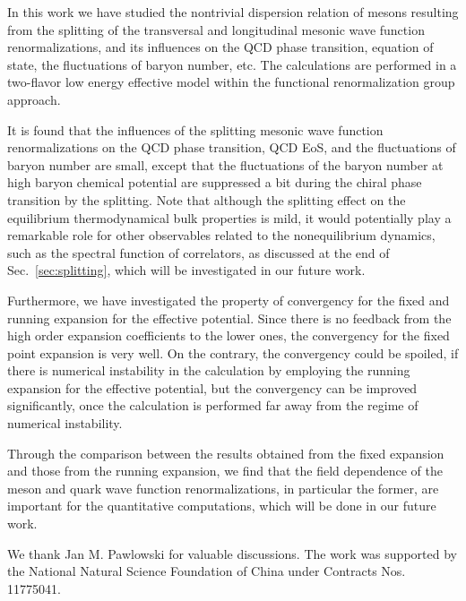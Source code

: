 \documentclass[%
reprint,
superscriptaddress,
showpacs,preprintnumbers,
 amsmath,amssymb,
 aps,
prd,
]{revtex4-1}
\def\sec#1{Sec.~\ref{#1}}
\begin{document}
In this work we have studied the nontrivial dispersion relation of mesons resulting from the splitting of the transversal and longitudinal mesonic wave function renormalizations, and its influences on the QCD phase transition, equation of state, the fluctuations of baryon number, etc. The calculations are performed in a two-flavor low energy effective model within the functional renormalization group approach. 

It is found that the influences of the splitting mesonic wave function renormalizations on the QCD phase transition, QCD EoS, and the fluctuations of baryon number are small, except that the fluctuations of the baryon number at high baryon chemical potential are suppressed a bit during the chiral phase transition by the splitting. Note that although the splitting effect on the equilibrium thermodynamical bulk properties is mild, it would potentially play a remarkable role for other observables related to the nonequilibrium dynamics, such as the spectral function of correlators, as discussed at the end of \sec{sec:splitting}, which will be investigated in our future work.

Furthermore, we have investigated the property of convergency for the fixed and running expansion for the effective potential. Since there is no feedback from the high order expansion coefficients to the lower ones, the convergency for the fixed point expansion is very well. On the contrary, the convergency could be spoiled, if there is numerical instability in the calculation by employing the running expansion for the effective potential, but the convergency can be improved significantly, once the calculation is performed far away from the regime of numerical instability. 

Through the comparison between the results obtained from the fixed expansion and those from the running expansion, we find that the field dependence of the meson and quark wave function renormalizations, in particular the former, are important for the quantitative computations, which will be done in our future work.



\begin{acknowledgments}

We thank Jan M. Pawlowski for valuable discussions. The work was supported by the National Natural Science Foundation of China under Contracts Nos. 11775041.

\end{acknowledgments}
\end{document}
